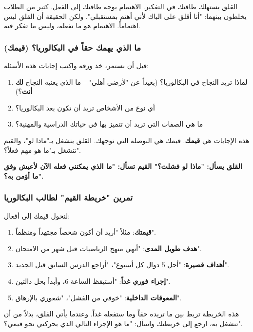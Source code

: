 \documentclass[12pt,a4paper]{book}
\newcommand{\importantAr}[1]{%
	\begin{important}
		\bfseries #1
	\end{important}
}
\begin{document}
	القلق يستهلك طاقتك في التفكير. الاهتمام يوجه طاقتك إلى الفعل. كثير من الطلاب يخلطون بينهما: "أنا أقلق على الباك لأني أهتم بمستقبلي". ولكن الحقيقة أن القلق ليس اهتماماً. الاهتمام هو ما تفعله، وليس ما تفكر فيه.
	
	\subsubsection{ما الذي يهمك حقاً في البكالوريا؟ (قيمك)}
	\label{subsec:values-bac}
	
	قبل أن نستمر، خذ ورقة واكتب إجابات هذه الأسئلة:
	
	\begin{enumerate}
		\item لماذا تريد النجاح في البكالوريا؟ (بعيداً عن "لأرضي أهلي" – ما الذي يعنيه النجاح \textbf{لك أنت}؟)
		\item أي نوع من الأشخاص تريد أن تكون بعد البكالوريا؟
		\item ما هي الصفات التي تريد أن تتميز بها في حياتك الدراسية والمهنية؟
	\end{enumerate}
	
	هذه الإجابات هي \textbf{قيمك}. قيمك هي البوصلة التي توجهك. القلق ينشغل بـ"ماذا لو"، والقيم تنشغل بـ"ما هو مهم فعلاً؟".
	
	\importantAr{القلق يسأل: "ماذا لو فشلت؟" القيم تسأل: "ما الذي يمكنني فعله الآن لأعيش وفق ما أؤمن به؟".}
	
	\subsubsection{تمرين "خريطة القيم" لطالب البكالوريا}
	\label{subsec:value-map}
	
	لنحول قيمك إلى أفعال:
	
	\begin{enumerate}
		\item \textbf{قيمتك}: مثلاً "أريد أن أكون شخصاً مجتهداً ومنظماً".
		\item \textbf{هدف طويل المدى}: "أنهي منهج الرياضيات قبل شهر من الامتحان".
		\item \textbf{أهداف قصيرة}: "أحل 5 دوال كل أسبوع"، "أراجع الدرس السابق قبل الجديد".
		\item \textbf{إجراء فوري غداً}: "أستيقظ الساعة 6، وأبدأ بحل دالتين".
		\item \textbf{المعوقات الداخلية}: "خوفي من الفشل"، "شعوري بالإرهاق".
	\end{enumerate}
	
	هذه الخريطة تربط بين ما تريده حقاً وما ستفعله غداً. وعندما يأتي القلق، بدلاً من أن تنشغل به، ارجع إلى خريطتك واسأل: "ما هو الإجراء التالي الذي يحركني نحو قيمي؟".
	
\end{document}
